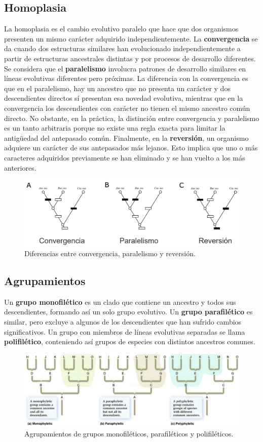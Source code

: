 \subsection{Homoplasia}
La homoplasia es el cambio evolutivo paralelo que hace que dos organismos presenten un mismo carácter adquirido independientemente. La \textbf{convergencia} se da cuando dos estructuras similares han evolucionado independientemente a partir de estructuras ancestrales distintas y por procesos de desarrollo diferentes. Se considera que el \textbf{paralelismo} involucra patrones de desarrollo similares en líneas evolutivas diferentes pero próximas. La diferencia con la convergencia es que en el paralelismo, hay un ancestro que no presenta un carácter y dos descendientes directos sí presentan esa novedad evolutiva, mientras que en la convergencia los descendientes con carácter no tienen el mismo ancestro común directo. No obstante, en la práctica, la distinción entre convergencia y paralelismo es un tanto arbitraria porque no existe una regla exacta para limitar la antigüedad del antepasado común. Finalmente, en la \textbf{reversión}, un organismo adquiere un carácter de sus antepasados más lejanos. Esto implica que uno o más caracteres adquiridos previamente se han eliminado y se han vuelto a los más anteriores. 

\begin{figure}[htbp]
\centering
\includegraphics[width=0.5\linewidth]{figs/homoplasia.png}
\caption{Diferencias entre convergencia, paralelismo y reversión.}
\end{figure}

\subsection{Agrupamientos}
Un \textbf{grupo monofilético} es un clado que contiene un ancestro y todos sus descendientes, formando así un solo grupo evolutivo. Un \textbf{grupo parafilético} es similar, pero excluye a algunos de los descendientes que han sufrido cambios significativos. Un grupo con miembros de líneas evolutivas separadas se llama \textbf{polifilético}, conteniendo así grupos de especies con distintos ancestros comunes. 

\begin{figure}[htbp]
\centering
\includegraphics[width=0.5\linewidth]{figs/agrupamientos.png}
\caption{Agrupamientos de grupos monofiléticos, parafiléticos y polifiléticos.}
\end{figure}

